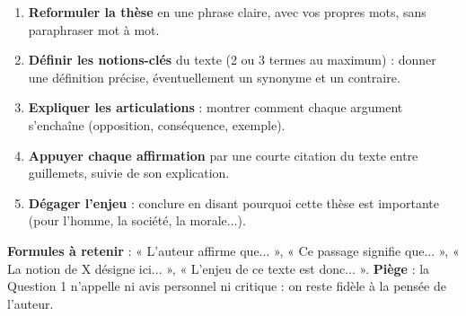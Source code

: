 \documentclass[11pt]{article}
\begin{document}
\begin{methode}
\begin{enumerate}
\item \textbf{Reformuler la thèse} en une phrase claire, avec vos propres mots, sans paraphraser mot à mot.
\item \textbf{Définir les notions-clés} du texte (2 ou 3 termes au maximum) : donner une définition précise, éventuellement un synonyme et un contraire.
\item \textbf{Expliquer les articulations} : montrer comment chaque argument s'enchaîne (opposition, conséquence, exemple).
\item \textbf{Appuyer chaque affirmation} par une courte citation du texte entre guillemets, suivie de son explication.
\item \textbf{Dégager l'enjeu} : conclure en disant pourquoi cette thèse est importante (pour l'homme, la société, la morale...).
\end{enumerate}
\textbf{Formules à retenir} : « L'auteur affirme que... », « Ce passage signifie que... », « La notion de X désigne ici... », « L'enjeu de ce texte est donc... ». \textbf{Piège} : la Question 1 n'appelle ni avis personnel ni critique : on reste fidèle à la pensée de l'auteur.
\end{methode}
\end{document}
